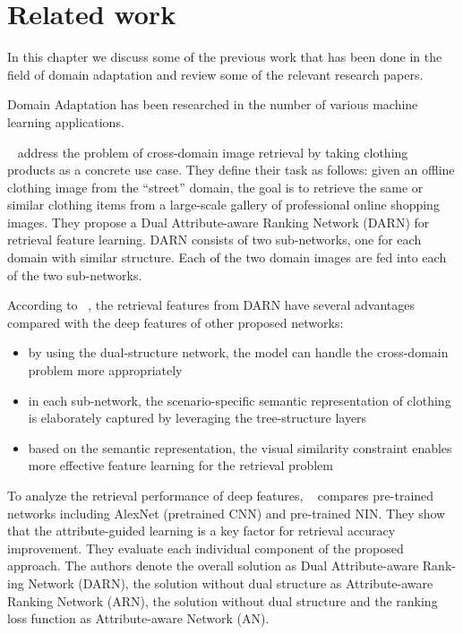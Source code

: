 \cleardoublepage

\chapter{Related work}
\label{relatedworkchapter}

In this chapter we discuss some of the previous work that has been done in the field of domain adaptation and review some of the relevant research papers.

Domain Adaptation has been researched in the number of various machine learning applications.

~\citep{crossdomimage} address the problem of cross-domain image retrieval by taking clothing products as a concrete use case. They define their task as follows: given an offline clothing image from the “street” domain, the goal is to retrieve the same or similar clothing items from a large-scale gallery of professional online shopping images. They propose a Dual Attribute-aware Ranking Network (DARN) for retrieval feature learning. DARN consists of two sub-networks, one for each domain with similar structure. Each of the two domain images are fed into each of the two sub-networks.

According to ~\citep{crossdomimage}, the retrieval features from DARN have several advantages compared with the deep features of other proposed networks:
\begin{itemize}
  \item by using the dual-structure network, the model can handle the cross-domain problem more appropriately
  \item in each sub-network, the scenario-specific semantic representation of clothing is elaborately captured by leveraging the tree-structure layers
  \item based on the semantic representation, the visual similarity constraint enables more effective feature learning for the retrieval problem
\end{itemize}

To analyze the retrieval performance of deep features, ~\citep{crossdomimage} compares pre-trained networks including AlexNet (pretrained CNN) and pre-trained NIN. They show that the attribute-guided learning is a key factor for retrieval accuracy improvement. They evaluate each individual component of the proposed approach. The authors denote the overall solution as Dual Attribute-aware Rank-ing Network (DARN), the solution without dual structure
as Attribute-aware Ranking Network (ARN), the solution without dual structure and the ranking loss function as
Attribute-aware Network (AN).

